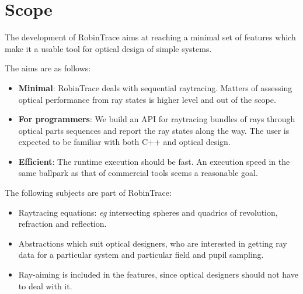 \section{Scope}
The development of RobinTrace aims at reaching a minimal set of features which
make it a usable tool for optical design of simple systems.

The aims are as follows:
\begin{itemize}
\item \textbf{Minimal}: RobinTrace deals with sequential raytracing. Matters of
assessing optical performance from ray states is higher level and out of the
scope.
\item \textbf{For programmers}: We build an API for raytracing bundles of
rays through optical parts sequences and report the ray states along the way.
The user is expected to be familiar with both C++ and optical design.
\item \textbf{Efficient}: The runtime execution should be fast. An
execution speed in the same ballpark as that of commercial tools seems
a reasonable goal.
\end{itemize}

The following subjects are part of RobinTrace:
\begin{itemize}
\item Raytracing equations: \emph{eg} intersecting spheres and quadrics of
revolution, refraction and reflection.
\item Abstractions which suit optical designers, who are interested in
getting ray data for a particular system and particular field and pupil
sampling.
\item Ray-aiming is included in the features, since optical designers
should not have to deal with it.
\end{itemize}

